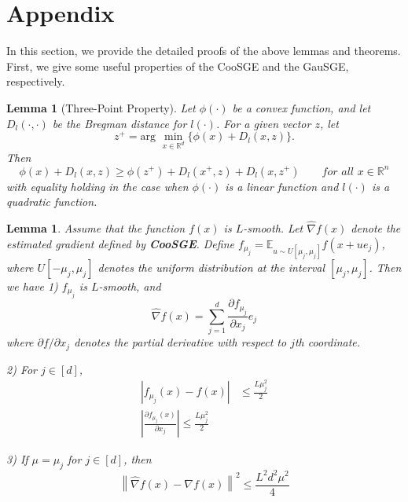 \documentclass{article}
\newcommand*{\R}{\mathbb{R}}
\newcommand*{\E}{\mathbb{E}}
\newcommand{\norm}[1]{\left\lVert#1\right\rVert}
\newcommand{\abs}[1]{\left|#1\right|}
\newtheorem{lemma}[theorem]{Lemma}
\theoremstyle{definition}
\theoremstyle{remark}
\begin{document}
\section{Appendix}
{\color{Green}
In this section, we provide the detailed proofs of the above lemmas and theorems. First, we give some useful properties of the CooSGE and the GauSGE, respectively.
}
\begin{lemma}[Three-Point Property]\label{threepoinineq} Let $\phi(\cdot)$ be a convex function, and let $D_{l}(\cdot,\cdot)$ be the Bregman distance for $l(\cdot)$. For a given vector $z$, let 
\[
z^+ = \text{arg}\,\,\min_{x\in\R^d}\{\phi(x)+D_{l}(x,z)\}.
\]
Then 
\begin{equation}
\phi(x) + D_l(x,z) \geq \phi(z^+) + D_l(x^+,z) + D_l(x,z^+)\qquad for\,\,all\,\,x\in\R^n
\end{equation}
with equality holding in the case when $\phi(\cdot)$ is a linear function and $l(\cdot)$ is a quadratic function.
\end{lemma}


\begin{lemma}\label{CooSGE}
Assume that the function $f(x)$ is $L$-smooth. Let $\hat{\nabla} f(x)$ denote the estimated gradient defined by {\bf CooSGE}. Define $f_{\mu_j} = \E_{u\sim U[\mu_j, \mu_j]} f(x+ue_j)$, where $U[-\mu_j,\mu_j]$ denotes the uniform distribution at the interval $[\mu_j, \mu_j]$. Then we have 
1) $f_{\mu_j}$ is $L$-smooth, and 
\begin{equation}
\hat{\nabla} f(x) = \sum_{j=1}^d \frac{\partial f_{\mu_j}}{\partial x_j}e_j
\end{equation} 
where $\partial f/\partial x_j$ denotes the partial derivative with respect to $j$th coordinate.

2) For $j\in [d]$, 
\begin{align}
\abs{f_{\mu_j}(x) - f(x)} &\leq \frac{L\mu_j^2}{2}\\
\abs{\frac{\partial f_{\mu_j}(x)}{\partial x_j}} \leq \frac{L\mu_j^2}{2}
\end{align}
 
 3) If $\mu = \mu_j$ for $j\in [d]$, then 
 \begin{equation}
 \norm{\hat{\nabla} f(x) - {\nabla} f(x)} ^2 \leq \frac{L^2 d^2 \mu^2}{4}
\end{equation}  
\end{lemma}
\end{document}
